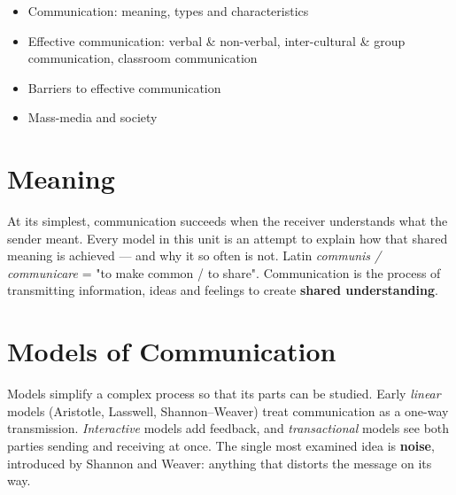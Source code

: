 

\begin{sylbox}

\begin{itemize}
\tightlist
\item[$\square$]
  Communication: meaning, types and characteristics
\item[$\square$]
  Effective communication: verbal \& non-verbal, inter-cultural \& group communication, classroom communication
\item[$\square$]
  Barriers to effective communication
\item[$\square$]
  Mass-media and society
\end{itemize}

\end{sylbox}

\needspace{191pt}

\hypertarget{p1-04--1-meaning}{%
\section{Meaning}\label{p1-04--1-meaning}}

At its simplest, communication succeeds when the receiver understands what the sender meant. Every model
in this unit is an attempt to explain how that shared meaning is achieved --- and why it so often is not.
Latin \emph{communis / communicare} = "to make common / to share". Communication is the process of transmitting
information, ideas and feelings to create \textbf{shared understanding}.

\needspace{125pt}

\hypertarget{p1-04--2-models-of-communication}{%
\section{Models of Communication}\label{p1-04--2-models-of-communication}}

Models simplify a complex process so that its parts can be studied. Early \emph{linear} models (Aristotle,
Lasswell, Shannon--Weaver) treat communication as a one-way transmission. \emph{Interactive} models add feedback,
and \emph{transactional} models see both parties sending and receiving at once. The single most examined idea is
\textbf{noise}, introduced by Shannon and Weaver: anything that distorts the message on its way.

